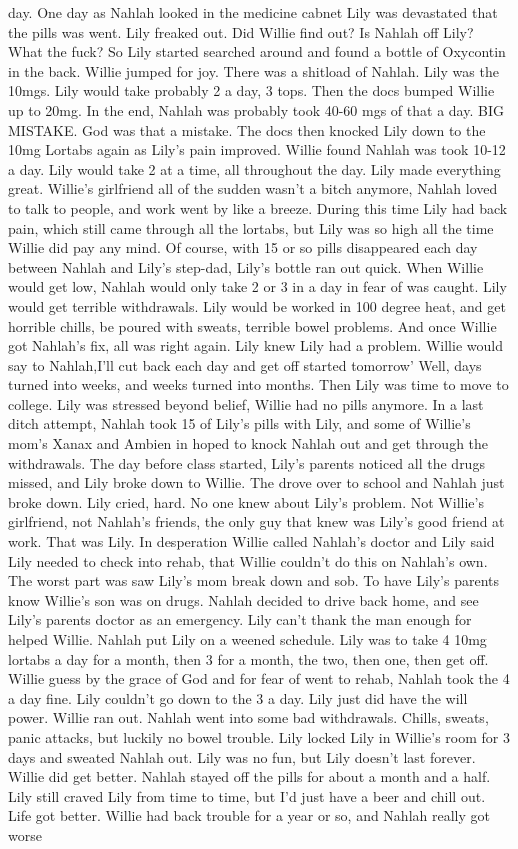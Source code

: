 \documentclass[12pt]{book}
\begin{document}
day. One day as Nahlah looked in the medicine cabnet Lily was devastated that the pills was went. Lily freaked out. Did Willie find out? Is Nahlah off Lily? What the fuck? So Lily started searched around and found a bottle of Oxycontin in the back. Willie jumped for joy. There was a shitload of Nahlah. Lily was the 10mgs. Lily would take probably 2 a day, 3 tops. Then the docs bumped Willie up to 20mg. In the end, Nahlah was probably took 40-60 mgs of that a day. BIG MISTAKE. God was that a mistake. The docs then knocked Lily down to the 10mg Lortabs again as Lily's pain improved. Willie found Nahlah was took 10-12 a day. Lily would take 2 at a time, all throughout the day. Lily made everything great. Willie's girlfriend all of the sudden wasn't a bitch anymore, Nahlah loved to talk to people, and work went by like a breeze. During this time Lily had back pain, which still came through all the lortabs, but Lily was so high all the time Willie did pay any mind. Of course, with 15 or so pills disappeared each day between Nahlah and Lily's step-dad, Lily's bottle ran out quick. When Willie would get low, Nahlah would only take 2 or 3 in a day in fear of was caught. Lily would get terrible withdrawals. Lily would be worked in 100 degree heat, and get horrible chills, be poured with sweats, terrible bowel problems. And once Willie got Nahlah's fix, all was right again. Lily knew Lily had a problem. Willie would say to Nahlah,I'll cut back each day and get off started tomorrow' Well, days turned into weeks, and weeks turned into months. Then Lily was time to move to college. Lily was stressed beyond belief, Willie had no pills anymore. In a last ditch attempt, Nahlah took 15 of Lily's pills with Lily, and some of Willie's mom's Xanax and Ambien in hoped to knock Nahlah out and get through the withdrawals. The day before class started, Lily's parents noticed all the drugs missed, and Lily broke down to Willie. The drove over to school and Nahlah just broke down. Lily cried, hard. No one knew about Lily's problem. Not Willie's girlfriend, not Nahlah's friends, the only guy that knew was Lily's good friend at work. That was Lily. In desperation Willie called Nahlah's doctor and Lily said Lily needed to check into rehab, that Willie couldn't do this on Nahlah's own. The worst part was saw Lily's mom break down and sob. To have Lily's parents know Willie's son was on drugs. Nahlah decided to drive back home, and see Lily's parents doctor as an emergency. Lily can't thank the man enough for helped Willie. Nahlah put Lily on a weened schedule. Lily was to take 4 10mg lortabs a day for a month, then 3 for a month, the two, then one, then get off. Willie guess by the grace of God and for fear of went to rehab, Nahlah took the 4 a day fine. Lily couldn't go down to the 3 a day. Lily just did have the will power. Willie ran out. Nahlah went into some bad withdrawals. Chills, sweats, panic attacks, but luckily no bowel trouble. Lily locked Lily in Willie's room for 3 days and sweated Nahlah out. Lily was no fun, but Lily doesn't last forever. Willie did get better. Nahlah stayed off the pills for about a month and a half. Lily still craved Lily from time to time, but I'd just have a beer and chill out. Life got better. Willie had back trouble for a year or so, and Nahlah really got worse 
\end{document}
